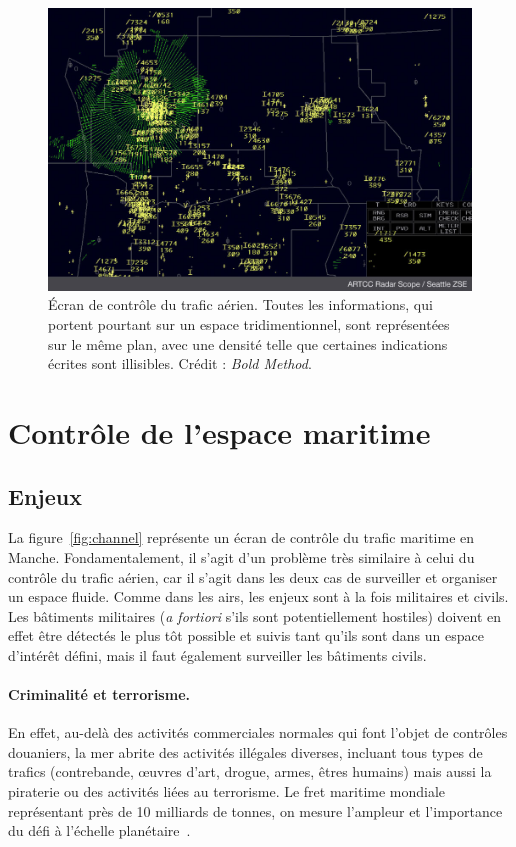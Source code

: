 	\begin{figure}[H]
		\centering
		\includegraphics[width=\textwidth]{figures/ch1/Radar-Scope-ZSE}
		\caption{Écran de contrôle du trafic aérien. Toutes les informations, qui portent pourtant sur un espace tridimentionnel, sont représentées sur le même plan, avec une densité telle que certaines indications écrites sont illisibles. Crédit : \emph{Bold Method}.}
		\label{fig:airtraffic}
	\end{figure}
	
	\section{Contrôle de l'espace maritime}
	\subsection{Enjeux}
	La figure~\ref{fig:channel} représente un écran de contrôle du trafic maritime en Manche. Fondamentalement, il s'agit d'un problème très similaire à celui du contrôle du trafic aérien, car il s'agit dans les deux cas de surveiller et organiser un espace fluide. Comme dans les airs, les enjeux sont à la fois militaires et civils. Les bâtiments militaires (\emph{a fortiori} s'ils sont potentiellement hostiles) doivent en effet être détectés le plus tôt possible et suivis tant qu'ils sont dans un espace d'intérêt défini, mais il faut également surveiller les bâtiments civils.
	
	\paragraph{Criminalité et terrorisme.}
	En effet, au-delà des activités commerciales normales qui font l'objet de contrôles douaniers, la mer abrite des activités illégales diverses, incluant tous types de trafics (contrebande, œuvres d'art, drogue, armes, êtres humains) mais aussi la piraterie ou des activités liées au terrorisme.
	Le fret maritime mondiale représentant près de 10 milliards de tonnes, on mesure l'ampleur et l'importance du défi à l'échelle planétaire~\cite{unctad}.
	

